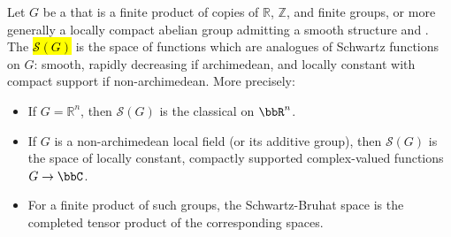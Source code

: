 \begin{definition} \label{definition:schwartz_bruhat_space_of_a_locally_compact_abelian_group}
Let $G$ be a  that is a finite product of copies of $\mathbb{R}$, $\mathbb{Z}$, and finite groups, or more generally a locally compact abelian group admitting a smooth structure and . The  \hl{$\mathcal{S}(G)$} is the space of functions which are analogues of Schwartz functions on $G$: smooth, rapidly decreasing if archimedean, and locally constant with compact support if non-archimedean. More precisely:
\begin{itemize}
    \item If $G = \mathbb{R}^n$, then $\mathcal{S}(G)$  is the classical  on $\bbR^n$.
    \item If $G$ is a non-archimedean local field (or its additive group), then $\mathcal{S}(G)$ is the space of locally constant, compactly supported complex-valued functions $G \to \bbC$.
    \item For a finite product of such groups, the Schwartz-Bruhat space is the completed tensor product of the corresponding spaces.
\end{itemize}
\end{definition}